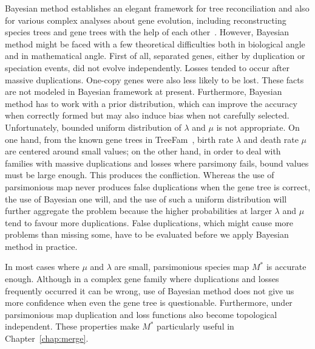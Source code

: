 Bayesian method establishes an elegant framework for tree reconciliation and also for
various complex analyses about gene evolution, including reconstructing species trees and gene trees
with the help of each other~\cite{arvestad04}.
However, Bayesian method might be faced with a few theoretical difficulties both in biological angle and
in mathematical angle. First of all, separated genes, either by duplication or speciation events, did not
evolve independently. Losses tended to occur after massive duplications. One-copy genes were also less likely to
be lost. These facts are not modeled in Bayesian framework at present.
Furthermore, Bayesian method has to work with
a prior distribution, which can improve the accuracy when correctly formed but may also induce bias when not carefully selected.
Unfortunately, bounded uniform distribution of $\lambda$ and $\mu$
is not appropriate. On one hand, from the known gene trees in TreeFam~\cite{li06},
birth rate $\lambda$ and death rate $\mu$ are centered around small values;
on the other hand, in order to deal with families with massive duplications
and losses where parsimony fails, bound values must be large enough. This produces the confliction.
Whereas the use of parsimonious map
never produces false duplications when the gene tree is correct, the use of Bayesian one will, and the use of such a uniform
distribution will further aggregate the problem because the higher probabilities
at larger $\lambda$ and $\mu$ tend to favour more duplications.
False duplications, which might cause more problems than
missing some, have to be evaluated before we apply Bayesian method in practice.

In most cases where $\mu$ and $\lambda$ are small, parsimonious species map $M^*$ is accurate enough.
Although in a complex gene family where duplications and losses frequently occurred it can be wrong, use of Bayesian method does not
give us more confidence when even the gene tree is questionable. Furthermore, under parsimonious
map duplication and loss functions also become topological independent.
These properties make $M^*$ particularly useful in Chapter~\ref{chap:merge}.

